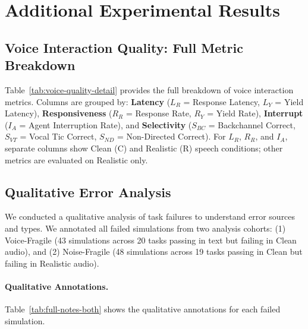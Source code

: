 \section{Additional Experimental Results}
\label{app:results}

\subsection{Voice Interaction Quality: Full Metric Breakdown}
\label{app:voice-metrics-detail}

Table~\ref{tab:voice-quality-detail} provides the full breakdown of voice interaction metrics. Columns are grouped by: \textbf{Latency} ($L_R$ = Response Latency, $L_Y$ = Yield Latency), \textbf{Responsiveness} ($R_R$ = Response Rate, $R_Y$ = Yield Rate), \textbf{Interrupt} ($I_A$ = Agent Interruption Rate), and \textbf{Selectivity} ($S_{BC}$ = Backchannel Correct, $S_{VT}$ = Vocal Tic Correct, $S_{ND}$ = Non-Directed Correct). For $L_R$, $R_R$, and $I_A$, separate columns show Clean (C) and Realistic (R) speech conditions; other metrics are evaluated on Realistic only.

\begin{table}[h]
\caption{Voice interaction quality metrics---full breakdown (Realistic condition). \textbf{Bold} indicates best per domain. $\uparrow$ = higher is better, $\downarrow$ = lower is better.}
\label{tab:voice-quality-detail}
\centering
\begin{small}
\resizebox{\textwidth}{!}{%

}
\end{small}
\end{table}



\subsection{Qualitative Error Analysis}
\label{app:qualitative-analysis}

We conducted a qualitative analysis of task failures to understand error sources and types. We annotated all failed simulations from two analysis cohorts: (1) Voice-Fragile (43 simulations across 20 tasks passing in text but failing in Clean audio), and (2) Noise-Fragile (48 simulations across 19 tasks passing in Clean but failing in Realistic audio).

\paragraph{Qualitative Annotations.}
Table~\ref{tab:full-notes-both} shows the qualitative annotations for each failed simulation.

